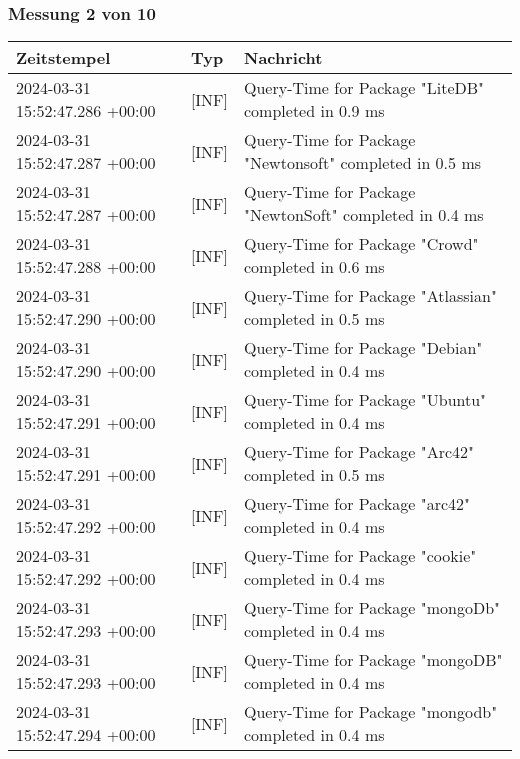     \subsubsection{Messung 2 von 10} \label{subsubsec:MySQLMitIndex2von10}
        {
            {\small
                \begin{tabularx}{\textwidth}{|l|l|X|}
                    \hline
                    \textbf{Zeitstempel} & \textbf{Typ} & \textbf{Nachricht} \\
                    \hline
                    \endhead
                    2024-03-31 15:52:47.286 +00:00 & [INF] & Query-Time for Package "LiteDB" completed in 0.9 ms \\
                    2024-03-31 15:52:47.287 +00:00 & [INF] & Query-Time for Package "Newtonsoft" completed in 0.5 ms \\
                    2024-03-31 15:52:47.287 +00:00 & [INF] & Query-Time for Package "NewtonSoft" completed in 0.4 ms \\
                    2024-03-31 15:52:47.288 +00:00 & [INF] & Query-Time for Package "Crowd" completed in 0.6 ms \\
                    2024-03-31 15:52:47.290 +00:00 & [INF] & Query-Time for Package "Atlassian" completed in 0.5 ms \\
                    2024-03-31 15:52:47.290 +00:00 & [INF] & Query-Time for Package "Debian" completed in 0.4 ms \\
                    2024-03-31 15:52:47.291 +00:00 & [INF] & Query-Time for Package "Ubuntu" completed in 0.4 ms \\
                    2024-03-31 15:52:47.291 +00:00 & [INF] & Query-Time for Package "Arc42" completed in 0.5 ms \\
                    2024-03-31 15:52:47.292 +00:00 & [INF] & Query-Time for Package "arc42" completed in 0.4 ms \\
                    2024-03-31 15:52:47.292 +00:00 & [INF] & Query-Time for Package "cookie" completed in 0.4 ms \\
                    2024-03-31 15:52:47.293 +00:00 & [INF] & Query-Time for Package "mongoDb" completed in 0.4 ms \\
                    2024-03-31 15:52:47.293 +00:00 & [INF] & Query-Time for Package "mongoDB" completed in 0.4 ms \\
                    2024-03-31 15:52:47.294 +00:00 & [INF] & Query-Time for Package "mongodb" completed in 0.4 ms \\

\end{tabularx}}}
